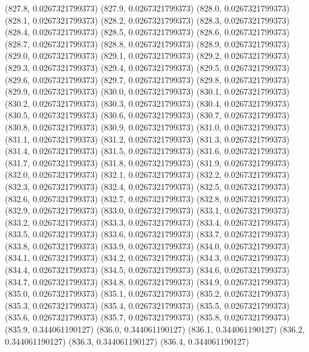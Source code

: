 {					(827.8, 0.0267321799373)
					(827.9, 0.0267321799373)
					(828.0, 0.0267321799373)
					(828.1, 0.0267321799373)
					(828.2, 0.0267321799373)
					(828.3, 0.0267321799373)
					(828.4, 0.0267321799373)
					(828.5, 0.0267321799373)
					(828.6, 0.0267321799373)
					(828.7, 0.0267321799373)
					(828.8, 0.0267321799373)
					(828.9, 0.0267321799373)
					(829.0, 0.0267321799373)
					(829.1, 0.0267321799373)
					(829.2, 0.0267321799373)
					(829.3, 0.0267321799373)
					(829.4, 0.0267321799373)
					(829.5, 0.0267321799373)
					(829.6, 0.0267321799373)
					(829.7, 0.0267321799373)
					(829.8, 0.0267321799373)
					(829.9, 0.0267321799373)
					(830.0, 0.0267321799373)
					(830.1, 0.0267321799373)
					(830.2, 0.0267321799373)
					(830.3, 0.0267321799373)
					(830.4, 0.0267321799373)
					(830.5, 0.0267321799373)
					(830.6, 0.0267321799373)
					(830.7, 0.0267321799373)
					(830.8, 0.0267321799373)
					(830.9, 0.0267321799373)
					(831.0, 0.0267321799373)
					(831.1, 0.0267321799373)
					(831.2, 0.0267321799373)
					(831.3, 0.0267321799373)
					(831.4, 0.0267321799373)
					(831.5, 0.0267321799373)
					(831.6, 0.0267321799373)
					(831.7, 0.0267321799373)
					(831.8, 0.0267321799373)
					(831.9, 0.0267321799373)
					(832.0, 0.0267321799373)
					(832.1, 0.0267321799373)
					(832.2, 0.0267321799373)
					(832.3, 0.0267321799373)
					(832.4, 0.0267321799373)
					(832.5, 0.0267321799373)
					(832.6, 0.0267321799373)
					(832.7, 0.0267321799373)
					(832.8, 0.0267321799373)
					(832.9, 0.0267321799373)
					(833.0, 0.0267321799373)
					(833.1, 0.0267321799373)
					(833.2, 0.0267321799373)
					(833.3, 0.0267321799373)
					(833.4, 0.0267321799373)
					(833.5, 0.0267321799373)
					(833.6, 0.0267321799373)
					(833.7, 0.0267321799373)
					(833.8, 0.0267321799373)
					(833.9, 0.0267321799373)
					(834.0, 0.0267321799373)
					(834.1, 0.0267321799373)
					(834.2, 0.0267321799373)
					(834.3, 0.0267321799373)
					(834.4, 0.0267321799373)
					(834.5, 0.0267321799373)
					(834.6, 0.0267321799373)
					(834.7, 0.0267321799373)
					(834.8, 0.0267321799373)
					(834.9, 0.0267321799373)
					(835.0, 0.0267321799373)
					(835.1, 0.0267321799373)
					(835.2, 0.0267321799373)
					(835.3, 0.0267321799373)
					(835.4, 0.0267321799373)
					(835.5, 0.0267321799373)
					(835.6, 0.0267321799373)
					(835.7, 0.0267321799373)
					(835.8, 0.0267321799373)
					(835.9, 0.344061190127)
					(836.0, 0.344061190127)
					(836.1, 0.344061190127)
					(836.2, 0.344061190127)
					(836.3, 0.344061190127)
					(836.4, 0.344061190127)
}
